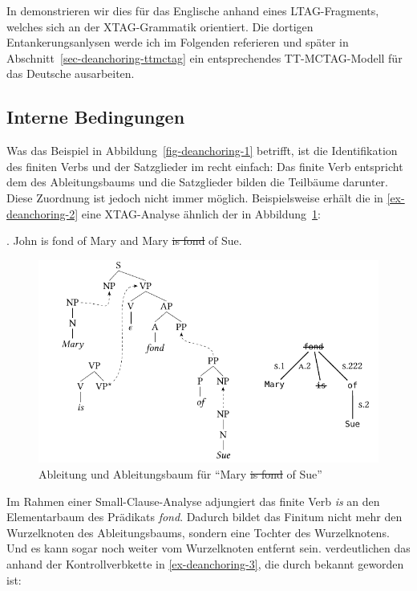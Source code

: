 In \cite{Lichte:Kallmeyer:10} demonstrieren wir dies für das Englische anhand eines LTAG-Fragments, welches sich an der XTAG-Grammatik \citep{xtag:01} orientiert. Die dortigen Entankerungsanlysen werde ich im Folgenden referieren und später in Abschnitt~\ref{sec-deanchoring-ttmctag} ein entsprechendes TT-MCTAG-Modell für das Deutsche ausarbeiten. 

\subsection{Interne Bedingungen} 

Was das Beispiel in Abbildung~\ref{fig-deanchoring-1} betrifft, ist die Identifikation des finiten Verbs und der Satzglieder im  recht einfach: Das finite Verb entspricht dem  des Ableitungsbaums und die Satzglieder bilden die Teilbäume darunter. Diese Zuordnung ist jedoch nicht immer möglich. Beispielsweise erhält die  in \ref{ex-deanchoring-2} eine XTAG-Analyse ähnlich der in Abbildung~\ref{fig-deanchoring-3}:    
  
\ex. \label{ex-deanchoring-2} John is fond of Mary and Mary \sout{is fond} of  Sue.
\hfill \citep[(4a)]{Lichte:Kallmeyer:10}

\begin{figure}[t]
\centering
\includegraphics{graphics/abb816.pdf}
\caption{\label{fig-deanchoring-3}Ableitung und Ableitungsbaum für "`Mary \sout{is fond} of Sue"' \citep[Figure~4]{Lichte:Kallmeyer:10}}
\end{figure} 
Im Rahmen einer Small-Clause-Analyse adjungiert das finite Verb {\it is} an den Elementarbaum des Prädikats {\it fond}. Dadurch bildet das Finitum nicht mehr den Wurzelknoten des Ableitungsbaums, sondern eine Tochter des Wurzelknotens. Und es kann sogar noch weiter vom Wurzelknoten entfernt sein. \cite{Lichte:Kallmeyer:10} verdeutlichen das anhand der Kontroll\-verb\-kette in \ref{ex-deanchoring-3}, die durch \cite{Ross:70} bekannt geworden ist:  

